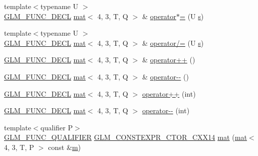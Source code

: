 \begin{DoxyCompactItemize}
\item 
{\footnotesize template$<$typename U $>$ }\\\mbox{\hyperlink{setup_8hpp_ab2d052de21a70539923e9bcbf6e83a51}{G\+L\+M\+\_\+\+F\+U\+N\+C\+\_\+\+D\+E\+CL}} \mbox{\hyperlink{structglm_1_1mat}{mat}}$<$ 4, 3, T, Q $>$ \& \mbox{\hyperlink{structglm_1_1mat_3_014_00_013_00_01_t_00_01_q_01_4_a023bcd2ba77d740cdc63219227571aca}{operator$\ast$=}} (U \mbox{\hyperlink{_s_d_l__opengl_8h_a4af680a6c683f88ed67b76f207f2e6e4}{s}})
\item 
{\footnotesize template$<$typename U $>$ }\\\mbox{\hyperlink{setup_8hpp_ab2d052de21a70539923e9bcbf6e83a51}{G\+L\+M\+\_\+\+F\+U\+N\+C\+\_\+\+D\+E\+CL}} \mbox{\hyperlink{structglm_1_1mat}{mat}}$<$ 4, 3, T, Q $>$ \& \mbox{\hyperlink{structglm_1_1mat_3_014_00_013_00_01_t_00_01_q_01_4_ae0dcc6b5b5a3d7aee42092985a16aeb6}{operator/=}} (U \mbox{\hyperlink{_s_d_l__opengl_8h_a4af680a6c683f88ed67b76f207f2e6e4}{s}})
\item 
\mbox{\hyperlink{setup_8hpp_ab2d052de21a70539923e9bcbf6e83a51}{G\+L\+M\+\_\+\+F\+U\+N\+C\+\_\+\+D\+E\+CL}} \mbox{\hyperlink{structglm_1_1mat}{mat}}$<$ 4, 3, T, Q $>$ \& \mbox{\hyperlink{structglm_1_1mat_3_014_00_013_00_01_t_00_01_q_01_4_ab869177fe302f1cef14bbca99a103eb1}{operator++}} ()
\item 
\mbox{\hyperlink{setup_8hpp_ab2d052de21a70539923e9bcbf6e83a51}{G\+L\+M\+\_\+\+F\+U\+N\+C\+\_\+\+D\+E\+CL}} \mbox{\hyperlink{structglm_1_1mat}{mat}}$<$ 4, 3, T, Q $>$ \& \mbox{\hyperlink{structglm_1_1mat_3_014_00_013_00_01_t_00_01_q_01_4_aaa6df2edca16cfac23a2806f2fd8ae61}{operator-\/-\/}} ()
\item 
\mbox{\hyperlink{setup_8hpp_ab2d052de21a70539923e9bcbf6e83a51}{G\+L\+M\+\_\+\+F\+U\+N\+C\+\_\+\+D\+E\+CL}} \mbox{\hyperlink{structglm_1_1mat}{mat}}$<$ 4, 3, T, Q $>$ \mbox{\hyperlink{structglm_1_1mat_3_014_00_013_00_01_t_00_01_q_01_4_afe2cd1deac96a5b687a5978e44652428}{operator++}} (int)
\item 
\mbox{\hyperlink{setup_8hpp_ab2d052de21a70539923e9bcbf6e83a51}{G\+L\+M\+\_\+\+F\+U\+N\+C\+\_\+\+D\+E\+CL}} \mbox{\hyperlink{structglm_1_1mat}{mat}}$<$ 4, 3, T, Q $>$ \mbox{\hyperlink{structglm_1_1mat_3_014_00_013_00_01_t_00_01_q_01_4_a1071ca01aa47be09af44bbff97d99639}{operator-\/-\/}} (int)
\item 
{\footnotesize template$<$qualifier P$>$ }\\\mbox{\hyperlink{setup_8hpp_a33fdea6f91c5f834105f7415e2a64407}{G\+L\+M\+\_\+\+F\+U\+N\+C\+\_\+\+Q\+U\+A\+L\+I\+F\+I\+ER}} \mbox{\hyperlink{setup_8hpp_a0900f9145e68bf6061b6f5e7be3fa751}{G\+L\+M\+\_\+\+C\+O\+N\+S\+T\+E\+X\+P\+R\+\_\+\+C\+T\+O\+R\+\_\+\+C\+X\+X14}} \mbox{\hyperlink{structglm_1_1mat_3_014_00_013_00_01_t_00_01_q_01_4_a313800de73dd26da692bec90ff24ad42}{mat}} (\mbox{\hyperlink{structglm_1_1mat}{mat}}$<$ 4, 3, T, P $>$ const \&\mbox{\hyperlink{_s_d_l__opengl__glext_8h_af593500c283bf1a787a6f947f503a5c2}{m}})

\end{DoxyCompactItemize}
